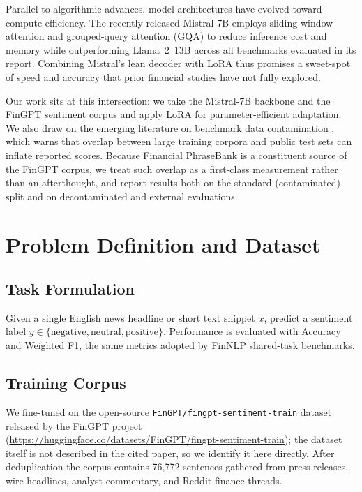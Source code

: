 \documentclass[a4paper]{article}
\begin{document}
Parallel to algorithmic advances, model architectures have evolved toward compute efficiency. The recently released Mistral-7B \cite{mistral2023} employs sliding-window attention and grouped-query attention (GQA) to reduce inference cost and memory while outperforming Llama~2~13B across all benchmarks evaluated in its report. Combining Mistral's lean decoder with LoRA thus promises a sweet-spot of speed and accuracy that prior financial studies have not fully explored.

Our work sits at this intersection: we take the Mistral-7B backbone and the FinGPT sentiment corpus and apply LoRA for parameter-efficient adaptation. We also draw on the emerging literature on benchmark data contamination \cite{oren2023contamination, xu2024leakage, roberts2023timelens}, which warns that overlap between large training corpora and public test sets can inflate reported scores. Because Financial PhraseBank is a constituent source of the FinGPT corpus, we treat such overlap as a first-class measurement rather than an afterthought, and report results both on the standard (contaminated) split and on decontaminated and external evaluations.


\section{Problem Definition and Dataset}

\subsection{Task Formulation}

Given a single English news headline or short text snippet $x$, predict a sentiment label $y \in \{\text{negative}, \text{neutral}, \text{positive}\}$. Performance is evaluated with Accuracy and Weighted F1, the same metrics adopted by FinNLP shared-task benchmarks.

\subsection{Training Corpus}

We fine-tuned on the open-source \texttt{FinGPT/fingpt-sentiment-train} dataset released by the FinGPT project \cite{yang2023} (\url{https://huggingface.co/datasets/FinGPT/fingpt-sentiment-train}); the dataset itself is not described in the cited paper, so we identify it here directly. After deduplication the corpus contains 76,772 sentences gathered from press releases, wire headlines, analyst commentary, and Reddit finance threads.
\end{document}
